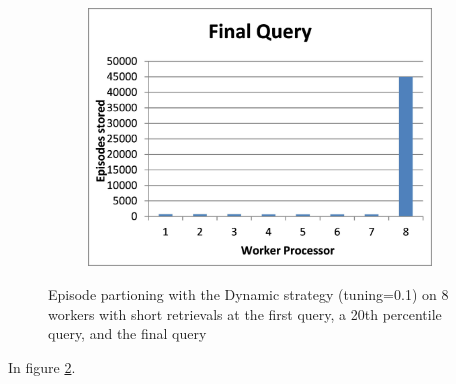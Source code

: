 \documentclass[11pt]{article} %
\begin{document}
\begin{figure}
\begin{subfigure}[b]{0.33\textwidth}
        \end{subfigure}%
        \begin{subfigure}[b]{0.33\textwidth}
                \centering
                \includegraphics[width=\textwidth]{images/shortfinalquery}
                \label{fig:shortdynam3}
        \end{subfigure}
        \caption{Episode partioning with the Dynamic strategy (tuning=0.1) on 8 workers with short retrievals at the first query, a 20th percentile query, and the final query}\label{fig:shortdynam}
\end{figure}

In figure \ref{fig:shortdynam}.
\end{document}
